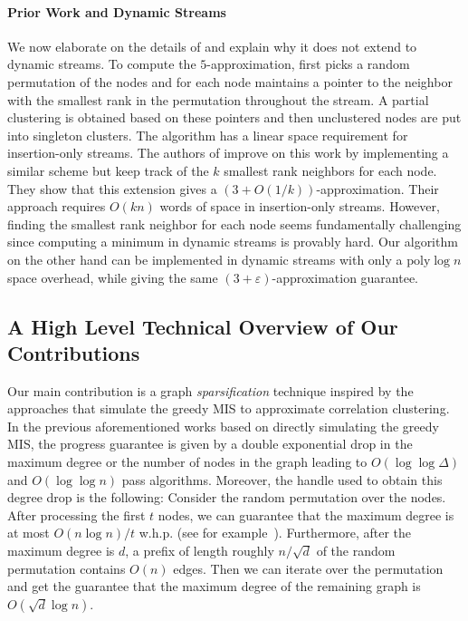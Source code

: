 \documentclass[10pt,a4paper]{article}
\newcommand{\poly}{\mathrm{poly}}
\newcommand{\eps}{\ensuremath{\varepsilon}}
\begin{document}
\paragraph{Prior Work and Dynamic Streams}
We now elaborate on the details of \cite{behnezhad2023single,chakrabarty2023singlepass} and explain why it does not extend to dynamic streams.
To compute the $5$-approximation, \cite{behnezhad2023single} first picks a random permutation of the nodes and for each node maintains a pointer to the neighbor with the smallest rank in the permutation throughout the stream. A partial clustering is obtained based on these pointers and then unclustered nodes are put into singleton clusters. The algorithm has a linear space requirement for insertion-only streams.
The authors of \cite{chakrabarty2023singlepass} improve on this work by implementing a similar scheme but keep track of the $k$ smallest rank neighbors for each node. They show that this extension gives a $(3+O(1/k))$-approximation. Their approach requires $O(kn)$ words of space in insertion-only streams. However, finding the smallest rank neighbor for each node seems fundamentally challenging since computing a minimum in dynamic streams is provably hard. Our algorithm on the other hand can be implemented in dynamic streams with only a $\poly\log n$ space overhead, while giving the same $(3+\eps)$-approximation guarantee.



\subsection{A High Level Technical Overview of Our Contributions}

Our main contribution is a graph \emph{sparsification} technique inspired by the approaches that simulate the greedy MIS to approximate correlation clustering.
In the previous aforementioned works based on directly simulating the greedy MIS, the progress guarantee is given by a double exponential drop in the maximum degree or the number of nodes in the graph leading to $O(\log \log \Delta)$ and $O(\log \log n)$ pass algorithms.
Moreover, the handle used to obtain this degree drop is the following:
Consider the random permutation over the nodes.
After processing the first $t$ nodes, we can guarantee that the maximum degree is at most $O(n \log n)/t$ w.h.p. (see for example~\cite{ahn2015correlation}).
Furthermore, after the maximum degree is $d$, a prefix of length roughly $n/\sqrt{d}$ of the random permutation contains $O(n)$ edges. 
Then we can iterate over the permutation and get the guarantee that the maximum degree of the remaining graph is $O(\sqrt{d}\log n)$.
\end{document}
